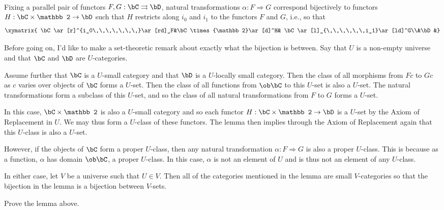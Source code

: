\documentclass[main.tex]{subfiles}
\begin{document}
\paragraph{}
\begin{lemma}
	Fixing a parallel pair of functors $F,G:\bC\rightrightarrows\bD$, natural
	transformations $\alpha:F\Rightarrow G$ correspond bijectively to functors
	$H:\bC\times{\mathbb 2}\rightarrow\bD$ such that $H$ restricts along $i_0$
	and $i_1$ to the functors $F$ and $G$, i.e., so that
	\[\xymatrix{
			\bC\ar[r]^{i_0\,\,\,\,\,\,\,}\ar[rd]_F&\bC\times{\mathbb 2}\ar[d]^H&
	\bC\ar[l]_{\,\,\,\,\,\,i_1}\ar[ld]^G\\&\bD&}\]
\end{lemma}
\popthm

Before going on, I'd like to make a set-theoretic remark about exactly what the
bijection is between. Say that $U$ is a non-empty universe and that $\bC$ and
$\bD$ are $U$-categories.

Assume further that $\bC$ is a $U$-small category and that $\bD$ is a
$U$-locally small category. Then the class of all morphisms from $Fc$ to $Gc$ as
$c$ varies over objects of $\bC$ forms a $U$-set. Then the class of all
functions from $\ob\bC$ to this $U$-set is also a $U$-set. The natural
transformations form a subclass of this $U$-set, and so the class of all natural
transformations from $F$ to $G$ forms a $U$-set.

In this case, $\bC\times{\mathbb 2}$ is also a $U$-small category and so each
functor $H:\bC\times{\mathbb 2}\rightarrow\bD$ is a $U$-set by the Axiom of
Replacement in $U$. We may thus form a $U$-class of these functors. The lemma
then implies through the Axiom of Replacement again that this $U$-class is also
a $U$-set.

However, if the objects of $\bC$ form a proper $U$-class, then any natural
transformation $\alpha:F\Rightarrow G$ is also a proper $U$-class. This is
because as a function, $\alpha$ has domain $\ob\bC$, a proper $U$-class. In this
case, $\alpha$ is not an element of $U$ and is thus not an element of any
$U$-class.

In either case, let $V$ be a universe such that $U\in V$. Then all of the
categories mentioned in the lemma are small $V$-categories so that the bijection
in the lemma is a bijection between $V$-sets.

\begin{exercise}
	Prove the lemma above.
\end{exercise}
\end{document}
